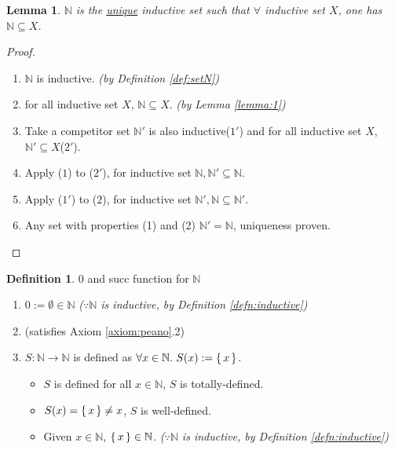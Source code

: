 \documentclass[12pt]{article}
\newenvironment{prf}
{
    \begin{proof}
        \hfill
        \begin{enumerate}[label*=\arabic*.]
                }
                {
                \hfill\qedsymbol
        \end{enumerate}
    \renewcommand{\qedsymbol}{}
    \end{proof}
}
\newcounter{dummy} \numberwithin{dummy}{section}
\newtheorem{lemma}[dummy]{Lemma}
\theoremstyle{definition}
\newtheorem{defn}[dummy]{Definition}
\newcommand{\nat}{\mathbb{N}}
\begin{document}
\begin{lemma} \label{lemma:2}
    $\nat$ is the \underline{unique} inductive set such that $\forall$ inductive set $X$, one has $\nat \subseteq X$.
\end{lemma}
\begin{prf}
\item $\nat$ is inductive. \hfill\emph{(by Definition \ref{def:setN})}
\item for all inductive set $X$, $\nat \subseteq X$. \hfill\emph{(by Lemma \ref{lemma:1})}
\item Take a competitor set $\nat'$ is also inductive($1'$) and for all inductive set $X$, $\nat' \subseteq X$($2'$).
\item Apply ($1$) to ($2'$), for inductive set $\nat, \nat' \subseteq \nat$.
\item Apply ($1'$) to ($2$), for inductive set $\nat', \nat \subseteq \nat'$.
\item Any set with properties (1) and (2) $\nat' = \nat$, uniqueness proven.
\end{prf}

\begin{defn} $0$ and succ function for $\nat$
    \begin{enumerate}
        \item $0 := \emptyset \in \nat$ \hfill\emph{($\because \nat$ is inductive, by Definition \ref{defn:inductive})}
        \item[] (satisfies Axiom \ref{axiom:peano}.2)
        \item $S:\nat \to \nat$ is defined as $\forall x \in \nat.~ S(x) := \set{x}$.
            \begin{itemize}
                \item $S$ is defined for all $x \in \nat$, $S$ is totally-defined.
                \item $S(x) = \set{x} \neq x$, $S$ is well-defined.
                \item Given $x \in \nat$, $\set{x} \in \nat$.
                    \hfill\emph{($\because \nat$ is inductive, by Definition \ref{defn:inductive})}
            \end{itemize}
    \end{enumerate}
\end{defn}
\hfill\\
\end{document}
